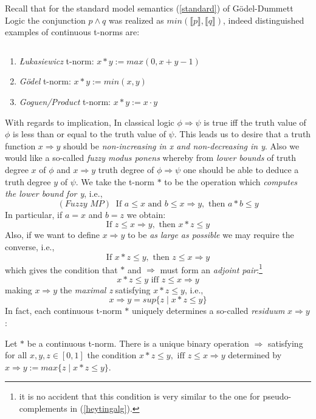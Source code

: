 	Recall that for the standard model semantics (\ref{standard}) of Gödel-Dummett Logic the conjunction $p \land q$ was realized as $min(\llbracket p \rrbracket, \llbracket q \rrbracket)$, indeed distinguished examples of continuous t-norms are:
	\begin{ex}\label{tnorms} ${ }$
		\begin{enumerate}[label=(\roman*)]
			\item \emph{\L{}ukasiewicz} t-norm: $x*y := max(0,x+y-1)$
			\item \emph{Gödel} t-norm: $x*y := min(x,y)$
			\item \emph{Goguen/Product} t-norm: $x*y := x \cdot y$
		\end{enumerate}	
	\end{ex}
	With regards to implication, In classical logic $\phi \Rightarrow \psi$ is true iff the truth value of $\phi$ is less than or equal to the truth value of $\psi$. This leads us to desire that a truth function $x \Rightarrow y$ should be \emph{non-increasing in x and non-decreasing in y}. \newline Also we would like a so-called \emph{fuzzy modus ponens}
	whereby from \emph{lower bounds} of truth degree $x$ of $\phi$ and $x\Rightarrow y$ truth degree of $\phi \Rightarrow \psi$ one should be able to deduce a truth degree $y$ of $\psi$. We take the t-norm $*$ to be the operation which \emph{computes the lower bound for y}, i.e., 
	\[(\textit{Fuzzy MP}) \;\; \text{If } a \leq x \text{ and } b \leq x \Rightarrow y, \text{ then }a * b \leq y \]
	In particular, if $a=x$ and $b=z$ we obtain:
		 \[\text{If } z \leq x \Rightarrow y, \text{ then }x * z \leq y \]
	Also, if we want to define $x \Rightarrow y$ to be \emph{as large as possible} we may require the converse, i.e.,
	\[\text{If } x * z \leq y, \text{ then }z \leq x \Rightarrow y \]
	which gives the condition that $*$ and $\Rightarrow$ must form an \emph{adjoint pair}:\footnote{it is no accident that this condition is very similar to the one for pseudo-complements in (\ref{heytingalg}).}
			 \[x * z \leq y \text{ iff }z \leq x \Rightarrow y \]
	making $x \Rightarrow y$ the \emph{maximal z} satisfying $x*z \leq y$, i.e.,
		\[ x \Rightarrow y = sup \{z \;|\; x*z \leq y\} \]	
In fact, each continuous t-norm $*$ uniquely determines a so-called \emph{residuum} $x \Rightarrow y$:
\begin{lem}
	Let $*$ be a continuous t-norm. There is a unique binary operation $\Rightarrow$ satisfying for all $x,y,z \in [0,1]$
	the condition $x * z \leq y, \text{ iff }z \leq x \Rightarrow y $ determined by $x \Rightarrow y := max\{z \;|\; x *z \leq y\}$.
\end{lem}
